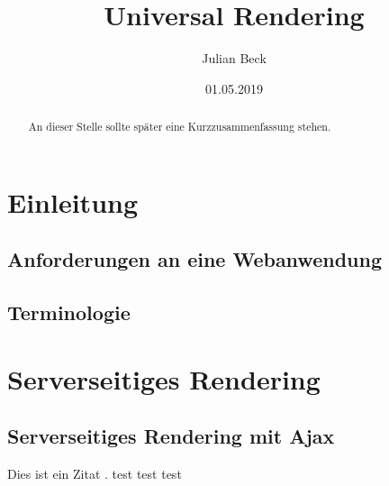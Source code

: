 \documentclass[runningheads]{llncs}
\title{Universal Rendering}
\author{Julian Beck}
\institute{Betreuer: Prof. Dr. rer. nat. Christian Zirpins}
\date{01.05.2019}
\begin{document}
\let\oldaddcontentsline\addcontentsline
\def\addcontentsline#1#2#3{}
\maketitle
\def\addcontentsline#1#2#3{\oldaddcontentsline{#1}{#2}{#3}}


\begin{abstract}
  An dieser Stelle sollte später eine Kurzzusammenfassung stehen.
\end{abstract}

\tableofcontents 
\newpage

\section{Einleitung}
\label{sec:Einleitung}


\subsection{Anforderungen an eine Webanwendung}
\label{subsec:Anforderungen an eine Webanwendung}

\subsection{Terminologie}
\label{subsec:Anforderungen an eine Webanwendung}


\section{Serverseitiges Rendering}
\label{sec:Serverseitiges Rendering}


\subsection{Serverseitiges Rendering mit Ajax}
\label{subsec:Serverseitiges Rendering mit Ajax}



Dies ist ein Zitat \cite{becker2008a}.
test\cite{IsomorphicApps}
test\cite{SearchFriendly}
test\cite{chen_chen_2016}
\end{document}
